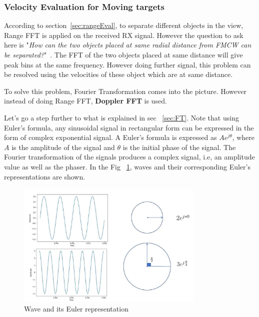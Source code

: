 \subsubsection{Velocity Evaluation for Moving targets}
According to section~\ref{sec:rangeEval}, to separate different objects in the view, Range FFT is applied on the received RX signal. However the question to ask here is "\textit{How can the two objects placed at same radial distance from FMCW can be separated?}"~\cite{rao_2017}. The FFT of the two objects placed at same distance will give peak bins at the same frequency. However doing further signal, this problem can be resolved using the velocities of these object which are at same distance.

To solve this problem, Fourier Transformation comes into the picture. However instead of doing Range FFT, \textbf{Doppler FFT} is used.

Let's go a step further to what is explained in sec ~\ref{sec:FT}. Note that using Euler's formula, any sinusoidal signal in rectangular form can be expressed in the form of complex exponential signal. A Euler's formula is expressed as \(Ae^{j\theta}\), where $A$ is the amplitude of the signal and $\theta$ is the initial phase of the signal. The Fourier transformation of the signals produces a complex signal, i.e, an amplitude value as well as the phaser. 
In the Fig ~\ref{fig:euler}, waves and their corresponding Euler's representations are shown.

 \begin{figure}[ht]
  \begin{center}
    \includegraphics[width=0.8\textwidth]{Master's thesis/images/euler.jpg} 
    \caption{Wave and its Euler representation}
    \label{fig:euler}
  \end{center}
\end{figure}  

